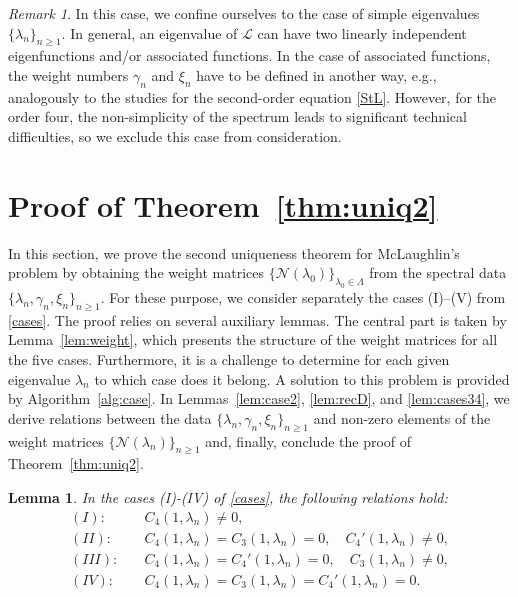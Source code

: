 \documentclass[a4paper,12pt]{article}
\newcommand{\ga}{\gamma}
\newcommand{\la}{\lambda}
\theoremstyle{plain}
\numberwithin{equation}{section}
\newtheorem{lem}[thm]{Lemma}
\theoremstyle{definition}
\theoremstyle{remark}
\newtheorem{remark}[thm]{Remark}
\begin{document}
\begin{remark}
In this case, we confine ourselves to the case of simple eigenvalues $\{ \la_n \}_{n \ge 1}$. In general, an eigenvalue of $\mathcal L$ can have two linearly independent eigenfunctions and/or associated functions. In the case of associated functions, the weight numbers $\ga_n$ and $\xi_n$ have to be defined in another way, e.g., analogously to the studies \cite{But07, BSY13} for the second-order equation \eqref{StL}. However, for the order four, the non-simplicity of the spectrum leads to significant technical difficulties, so we exclude this case from consideration.
\end{remark}

\section{Proof of Theorem~\ref{thm:uniq2}} \label{sec:uniq2}

In this section, we prove the second uniqueness theorem for McLaughlin's problem by obtaining the weight matrices $\{ \mathcal N(\la_0) \}_{\la_0 \in \Lambda}$ from the spectral data $\{ \la_n, \ga_n, \xi_n \}_{n \ge 1}$. For these purpose, we consider separately the cases (I)--(V) from \eqref{cases}. The proof relies on several auxiliary lemmas. The central part is taken by Lemma~\ref{lem:weight}, which presents the structure of the weight matrices for all the five cases. Furthermore, it is a challenge to determine for each given eigenvalue $\la_n$ to which case does it belong. A solution to this problem is provided by Algorithm~\ref{alg:case}.  In Lemmas~\ref{lem:case2}, \ref{lem:recD}, and \ref{lem:cases34}, we derive relations between the data $\{ \la_n, \ga_n, \xi_n \}_{n \ge 1}$ and non-zero elements of the weight matrices $\{ \mathcal N(\la_n) \}_{n \ge 1}$ and, finally, conclude the proof of Theorem~\ref{thm:uniq2}. 

\begin{lem} \label{lem:aux2}
In the cases (I)-(IV) of \eqref{cases}, the following relations hold:
\begin{align*}
(I) \colon & \quad C_4(1, \la_n) \ne 0, \\
(II) \colon & \quad C_4(1, \la_n) = C_3(1, \la_n) = 0, \quad C_4'(1, \la_n) \ne 0, \\
(III) \colon & \quad C_4(1, \la_n) = C_4'(1, \la_n) = 0, \quad C_3(1, \la_n) \ne 0, \\
(IV) \colon & \quad C_4(1, \la_n) = C_3(1, \la_n) = C_4'(1, \la_n) = 0.
\end{align*}
\end{lem}
\end{document}
